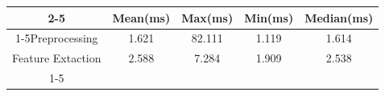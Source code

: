 \documentclass{standalone}
\begin{document}
 
 \begin{tabular}{|c |c |c |c |c |}
\cline{2-5}\cline{2-5} \multicolumn{1}{c |}{ } & Mean(ms) & Max(ms) & Min(ms) & Median(ms)\\ 
\cline{1-5}Preprocessing & 1.621 & 82.111 & 1.119 & 1.614\\ 
 \hhline{|=|=|=|=|=|}Feature Extaction & 2.588 & 7.284 & 1.909 & 2.538\\ 
 \cline{1-5}\hline \end{tabular}
 
\end{document}

